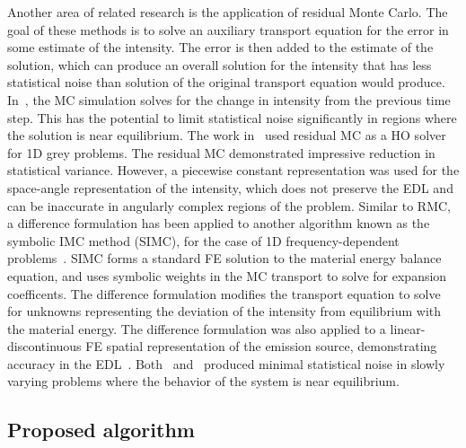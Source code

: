 \documentclass[11pt]{article}
\begin{document}
Another area of related research is the application of
residual Monte Carlo.  The goal of these methods is to solve an auxiliary transport
equation for the error in some estimate of the intensity.  The error is then added to the
estimate of the solution, which can produce an overall solution for the intensity that has
less statistical noise than solution of the original transport equation would produce.  In~\cite{rmc}, the MC simulation
solves for the change in intensity from the previous time step. This has the potential to limit statistical noise
significantly in regions where the solution is near equilibrium.
The work in~\cite{rmc} used residual MC as a HO solver for 1D grey problems. The
  residual MC demonstrated impressive reduction in statistical variance.
  However, a piecewise constant representation was used for the
space-angle representation of the intensity, which
does not preserve the EDL and can be inaccurate in angularly complex regions of the
problem.  Similar to RMC, a difference formulation has been applied to another algorithm known as the symbolic IMC method
(SIMC), for the case of 1D frequency-dependent problems~\cite{simc_const}.  SIMC forms a
standard FE solution to the material energy balance equation, and uses symbolic
weights in the MC transport to solve for expansion coefficents.  The difference
formulation modifies the transport equation to solve for unknowns representing the
deviation of the intensity from
equilibrium with the material energy.  The difference
formulation was also applied to a linear-discontinuous FE spatial
representation of the emission source, demonstrating accuracy in the EDL~\cite{simc}. 
Both~\cite{simc_const} and~\cite{rmc} produced minimal
statistical noise in slowly varying problems where the behavior of the system is near
equilibrium. 

\subsection{Proposed algorithm}
\end{document}
